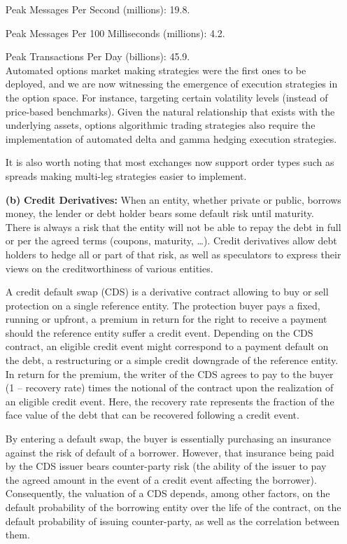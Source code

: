 \begin{enumerate}
Peak Messages Per Second (millions): 19.8.

Peak Messages Per 100 Milliseconds (millions): 4.2.

Peak Transactions Per Day (billions): 45.9. \\


Automated options market making strategies were the first ones to be deployed, and we are now witnessing the emergence of execution strategies in the option space. For instance, targeting certain volatility levels (instead of price-based benchmarks). Given the natural relationship that exists with the underlying assets, options algorithmic trading strategies also require the implementation of automated delta and gamma hedging execution strategies.


It is also worth noting that most exchanges now support order types such as spreads making multi-leg strategies easier to implement.


\item[\textbf{(b)}] \textbf{Credit Derivatives:} When an entity, whether private or public, borrows money, the lender or debt holder bears some default risk until maturity. There is always a risk that the entity will not be able to repay the debt in full or per the agreed terms (coupons, maturity, \dots). Credit derivatives allow debt holders to hedge all or part of that risk, as well as speculators to express their views on the creditworthiness of various entities. 


A credit default swap (CDS) is a derivative contract allowing to buy or sell protection on a single reference entity. The protection buyer pays a fixed, running or upfront, a premium in return for the right to receive a payment should the reference entity suffer a credit event. Depending on the CDS contract, an eligible credit event might correspond to a payment default on the debt, a restructuring or a simple credit downgrade of the reference entity. In return for the premium, the writer of the CDS agrees to pay to the buyer (1 -- recovery rate) times the notional of the contract upon the realization of an eligible credit event. Here, the recovery rate represents the fraction of the face value of the debt that can be recovered following a credit event.


By entering a default swap, the buyer is essentially purchasing an insurance against the risk of default of a borrower. However, that insurance being paid by the CDS issuer bears counter-party risk (the ability of the issuer to pay the agreed amount in the event of a credit event affecting the borrower). Consequently, the valuation of a CDS depends, among other factors, on the default probability of the borrowing entity over the life of the contract, on the default probability of issuing counter-party, as well as the correlation between them.



\end{enumerate}
